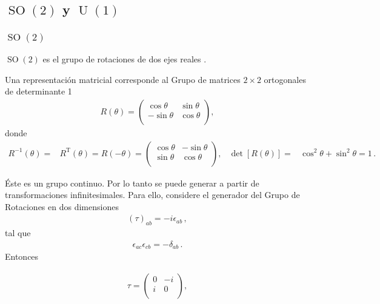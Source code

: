 \subsection{$\operatorname{SO}(2)$ y $\operatorname{U}(1)$}

\subsubsection{$\operatorname{SO}(2)$}



$\operatorname{SO}(2)$ es el grupo de rotaciones de dos ejes reales .
\begin{frame}
Una representación matricial corresponde al Grupo de matrices $2\times 2$ ortogonales de determinante 1
\begin{align*}
  R(\theta)=
  \begin{pmatrix}
  \cos\theta &\sin\theta\\  
  -\sin\theta&\cos\theta\\  
  \end{pmatrix},
\end{align*}
donde
\begin{align*}
  R^{-1}(\theta)=& R^{\operatorname{T}}(\theta)=R(-\theta)
=
  \begin{pmatrix}
  \cos\theta &-\sin\theta\\  
  \sin\theta&\cos\theta\\  
  \end{pmatrix}, & \det[R(\theta)]=&\cos^2\theta+\sin^2\theta=1\,.
\end{align*}

Éste es  un grupo continuo. Por lo tanto se puede generar a partir de transformaciones infinitesimales.
Para ello,
considere el generador del Grupo de Rotaciones en dos dimensiones
\begin{align}
  \label{eq:ieab}
(\tau)_{ab}=-i \epsilon_{ab}\,, 
\end{align}
tal que
\begin{align*}
\epsilon_{ac}\epsilon_{cb}=-\delta_{ab}\,.
\end{align*}
Entonces  

\begin{align}
  \label{eq:so2g}
  \tau=
  \begin{pmatrix}
   0 & -i \\
   i & 0 \\    
  \end{pmatrix},
\end{align}
\end{frame}
